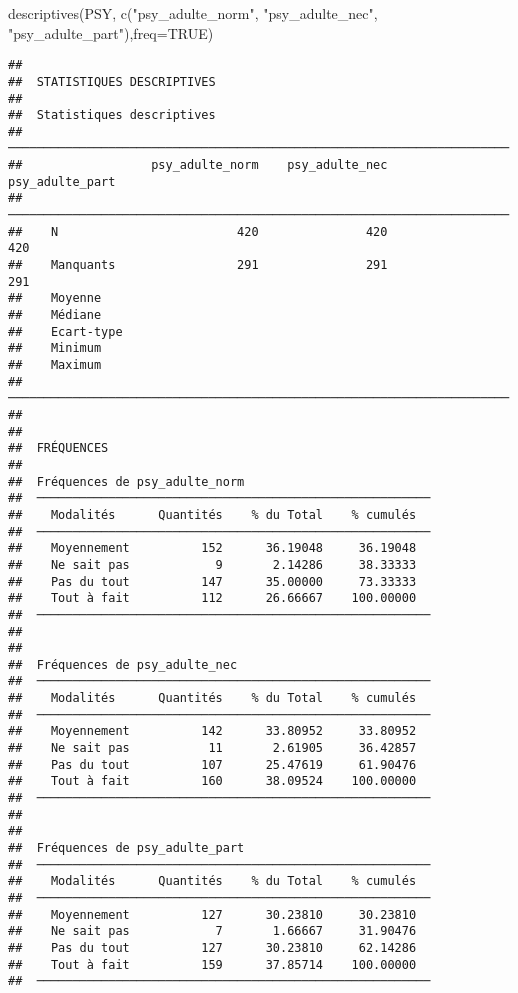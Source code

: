 \documentclass[
]{article}
\newenvironment{Shaded}{\begin{snugshade}}{\end{snugshade}}
\newcommand{\AttributeTok}[1]{\textcolor[rgb]{0.77,0.63,0.00}{#1}}
\newcommand{\ConstantTok}[1]{\textcolor[rgb]{0.00,0.00,0.00}{#1}}
\newcommand{\FunctionTok}[1]{\textcolor[rgb]{0.00,0.00,0.00}{#1}}
\newcommand{\NormalTok}[1]{#1}
\newcommand{\StringTok}[1]{\textcolor[rgb]{0.31,0.60,0.02}{#1}}
\begin{document}
\begin{Shaded}
\begin{Highlighting}[]
\FunctionTok{descriptives}\NormalTok{(PSY, }\FunctionTok{c}\NormalTok{(}\StringTok{"psy\_adulte\_norm"}\NormalTok{, }\StringTok{"psy\_adulte\_nec"}\NormalTok{, }\StringTok{"psy\_adulte\_part"}\NormalTok{),}\AttributeTok{freq=}\ConstantTok{TRUE}\NormalTok{)}
\end{Highlighting}
\end{Shaded}

\begin{verbatim}
## 
##  STATISTIQUES DESCRIPTIVES
## 
##  Statistiques descriptives                                              
##  ────────────────────────────────────────────────────────────────────── 
##                  psy_adulte_norm    psy_adulte_nec    psy_adulte_part   
##  ────────────────────────────────────────────────────────────────────── 
##    N                         420               420                420   
##    Manquants                 291               291                291   
##    Moyenne                                                              
##    Médiane                                                              
##    Ecart-type                                                           
##    Minimum                                                              
##    Maximum                                                              
##  ────────────────────────────────────────────────────────────────────── 
## 
## 
##  FRÉQUENCES
## 
##  Fréquences de psy_adulte_norm                           
##  ─────────────────────────────────────────────────────── 
##    Modalités      Quantités    % du Total    % cumulés   
##  ─────────────────────────────────────────────────────── 
##    Moyennement          152      36.19048     36.19048   
##    Ne sait pas            9       2.14286     38.33333   
##    Pas du tout          147      35.00000     73.33333   
##    Tout à fait          112      26.66667    100.00000   
##  ─────────────────────────────────────────────────────── 
## 
## 
##  Fréquences de psy_adulte_nec                            
##  ─────────────────────────────────────────────────────── 
##    Modalités      Quantités    % du Total    % cumulés   
##  ─────────────────────────────────────────────────────── 
##    Moyennement          142      33.80952     33.80952   
##    Ne sait pas           11       2.61905     36.42857   
##    Pas du tout          107      25.47619     61.90476   
##    Tout à fait          160      38.09524    100.00000   
##  ─────────────────────────────────────────────────────── 
## 
## 
##  Fréquences de psy_adulte_part                           
##  ─────────────────────────────────────────────────────── 
##    Modalités      Quantités    % du Total    % cumulés   
##  ─────────────────────────────────────────────────────── 
##    Moyennement          127      30.23810     30.23810   
##    Ne sait pas            7       1.66667     31.90476   
##    Pas du tout          127      30.23810     62.14286   
##    Tout à fait          159      37.85714    100.00000   
##  ───────────────────────────────────────────────────────
\end{verbatim}
\end{document}
